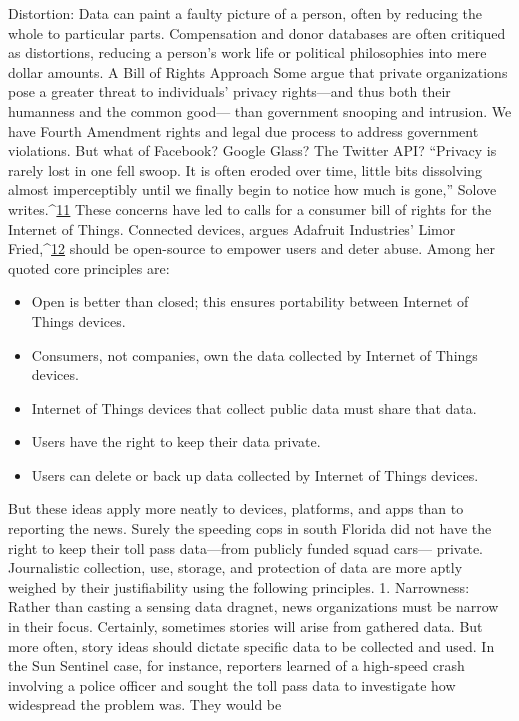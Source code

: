 Distortion: Data can paint a faulty picture of a person, often by reducing
the whole to particular parts. Compensation and donor databases are often
critiqued as distortions, reducing a person's work life or political philosophies
into mere dollar amounts.
A Bill of Rights Approach
Some argue that private organizations pose a greater threat to individuals'
privacy rights—and thus both their humanness and the common good—
than government snooping and intrusion. We have Fourth Amendment
rights and legal due process to address government violations. But what of
Facebook? Google Glass? The Twitter API?
``Privacy is rarely lost in one fell swoop. It is often eroded over time, little
bits dissolving almost imperceptibly until we finally begin to notice how
much is gone,'' Solove writes.^{\href{#endnotes-culver}{11}}
These concerns have led to calls for a consumer bill of rights for the Internet
of Things. Connected devices, argues Adafruit Industries' Limor Fried,^{\href{#endnotes-culver}{12}}
should be open-source to empower users and deter abuse. Among her
quoted core principles are:
\begin{itemize}
\item Open is better than closed; this ensures portability between
Internet of Things devices.
\item Consumers, not companies, own the data collected by Internet
of Things devices.
\item Internet of Things devices that collect public data must share
that data.
\item Users have the right to keep their data private.
\item Users can delete or back up data collected by Internet of
Things devices.
\end{itemize}
But these ideas apply more neatly to devices, platforms, and apps than to
reporting the news. Surely the speeding cops in south Florida did not have
the right to keep their toll pass data—from publicly funded squad cars—
private. Journalistic collection, use, storage, and protection of data are more
aptly weighed by their justifiability using the following principles.
1. Narrowness: Rather than casting a sensing data dragnet, news organizations
must be narrow in their focus. Certainly, sometimes stories will arise
from gathered data. But more often, story ideas should dictate specific data
to be collected and used. In the Sun Sentinel case, for instance, reporters
learned of a high-speed crash involving a police officer and sought the toll
pass data to investigate how widespread the problem was. They would be

